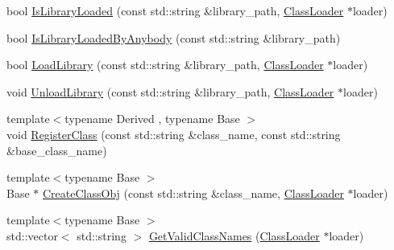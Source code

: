 \begin{DoxyCompactItemize}
\item 
bool \hyperlink{namespaceapollo_1_1cyber_1_1class__loader_1_1utility_a88f5efcdbb427a9fdacd391c21ba807b}{Is\-Library\-Loaded} (const std\-::string \&library\-\_\-path, \hyperlink{classapollo_1_1cyber_1_1class__loader_1_1ClassLoader}{Class\-Loader} $\ast$loader)
\item 
bool \hyperlink{namespaceapollo_1_1cyber_1_1class__loader_1_1utility_a699f7658f6d62a8d2a9427dbb2141873}{Is\-Library\-Loaded\-By\-Anybody} (const std\-::string \&library\-\_\-path)
\item 
bool \hyperlink{namespaceapollo_1_1cyber_1_1class__loader_1_1utility_a656284cd0c26b5728ff519bb67d3b830}{Load\-Library} (const std\-::string \&library\-\_\-path, \hyperlink{classapollo_1_1cyber_1_1class__loader_1_1ClassLoader}{Class\-Loader} $\ast$loader)
\item 
void \hyperlink{namespaceapollo_1_1cyber_1_1class__loader_1_1utility_a94aadacc8880f1c0d157d0294fe00b32}{Unload\-Library} (const std\-::string \&library\-\_\-path, \hyperlink{classapollo_1_1cyber_1_1class__loader_1_1ClassLoader}{Class\-Loader} $\ast$loader)
\item 
{\footnotesize template$<$typename Derived , typename Base $>$ }\\void \hyperlink{namespaceapollo_1_1cyber_1_1class__loader_1_1utility_a097070a23abf68916e625fdfe817f5a1}{Register\-Class} (const std\-::string \&class\-\_\-name, const std\-::string \&base\-\_\-class\-\_\-name)
\item 
{\footnotesize template$<$typename Base $>$ }\\Base $\ast$ \hyperlink{namespaceapollo_1_1cyber_1_1class__loader_1_1utility_a830e6d047a7b482ce10ab64efb4e6470}{Create\-Class\-Obj} (const std\-::string \&class\-\_\-name, \hyperlink{classapollo_1_1cyber_1_1class__loader_1_1ClassLoader}{Class\-Loader} $\ast$loader)
\item 
{\footnotesize template$<$typename Base $>$ }\\std\-::vector$<$ std\-::string $>$ \hyperlink{namespaceapollo_1_1cyber_1_1class__loader_1_1utility_a5cbc89db3b5172482c7a38d06739fa1b}{Get\-Valid\-Class\-Names} (\hyperlink{classapollo_1_1cyber_1_1class__loader_1_1ClassLoader}{Class\-Loader} $\ast$loader)
\end{DoxyCompactItemize}


